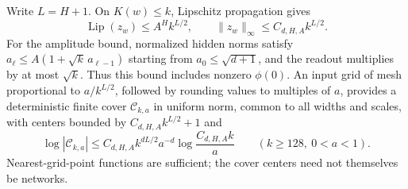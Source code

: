 Write $L=H+1$.  On $K(w)\leq k$, Lipschitz propagation gives
\[
 \operatorname{Lip}(z_w)\leq A^H k^{L/2},\qquad
 \|z_w\|_\infty\leq C_{d,H,A}k^{L/2}.
\]
For the amplitude bound, normalized hidden norms satisfy
$a_\ell\leq A(1+\sqrt k\,a_{\ell-1})$ starting from
$a_0\leq\sqrt{d+1}$, and the readout multiplies by at most $\sqrt k$.
Thus this bound includes nonzero $\phi(0)$.
An input grid of mesh proportional to $a/k^{L/2}$, followed by rounding
values to multiples of $a$, provides a deterministic finite cover
$\mathcal C_{k,a}$ in uniform norm, common to all widths and scales,
with centers bounded by $C_{d,H,A}k^{L/2}+1$ and
\begin{equation}
 \log|\mathcal C_{k,a}|
 \leq C_{d,H,A} k^{dL/2}a^{-d}
                  \log\frac{C_{d,H,A}k}{a}
 \qquad(k\geq128,\ 0<a<1).
 \label{ag-eq:general-activation-cover}
\end{equation}
Nearest-grid-point functions are sufficient; the cover centers need
not themselves be networks.

